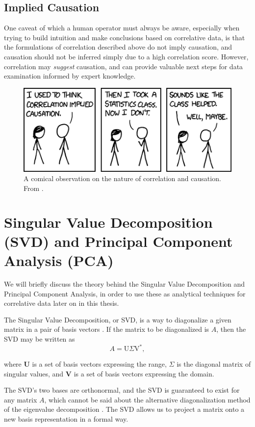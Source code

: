 \subsection{Implied Causation}

One caveat of which a human operator must always be aware, especially when trying to build intuition and make conclusions based on correlative data, is that the formulations of correlation described above do not imply causation, and causation should not be inferred simply due to a high correlation score. However, correlation may \textit{suggest} causation, and can provide valuable next steps for data examination informed by expert knowledge.

\begin{figure}[h]
\centering
    \includegraphics[width=0.5\columnwidth]{images/xkcd_correlation.png}
    \caption{A comical observation on the nature of correlation and causation. From \cite{xkcd_correlation}.}
    \label{fig:xkcd_correction}
\end{figure}


\section{Singular Value Decomposition (SVD) and Principal Component Analysis (PCA)}

We will briefly discuss the theory behind the Singular Value Decomposition and Principal Component Analysis, in order to use these as analytical techniques for correlative data later on in this thesis.

The Singular Value Decomposition, or SVD, is a way to diagonalize a given matrix in a pair of basis vectors \cite{kutz2013data}. If the matrix to be diagonalized is $A$, then the SVD may be written as
\begin{equation} \label{eq:svd}
A = \text{U} \Sigma \text{V}^{*},
\end{equation}

where \textbf{U} is a set of basis vectors expressing the range, $\Sigma$ is the diagonal matrix of singular values, and \textbf{V} is a set of basis vectors expressing the domain.

The SVD's two bases are orthonormal, and the SVD is guaranteed to exist for any matrix $A$, which cannot be said about the alternative diagonalization method of the eigenvalue decomposition \cite{kutz2013data}. The SVD allows us to project a matrix onto a new basis representation in a formal way.

